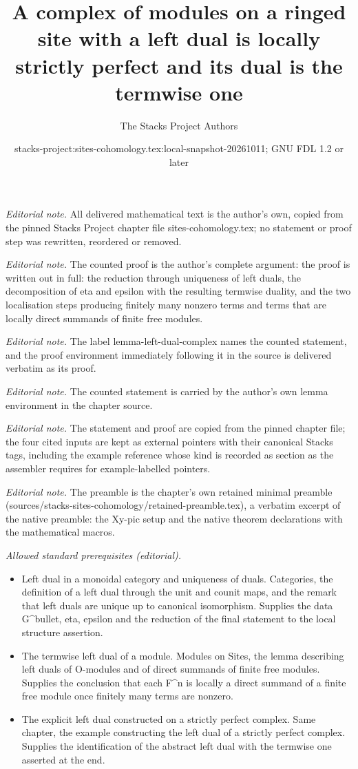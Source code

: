 \documentclass[10pt,a4paper]{amsart}
\title{A complex of modules on a ringed site with a left dual is locally strictly perfect and its dual is the termwise one}
\author{The Stacks Project Authors}
\date{stacks-project:sites-cohomology.tex:local-snapshot-20261011; GNU FDL 1.2 or later}
\theoremstyle{plain}
\theoremstyle{definition}
\theoremstyle{remark}
\numberwithin{equation}{subsection}
\begin{document}
\maketitle
\noindent\textit{Editorial note.} All delivered mathematical text is the author's own, copied from the pinned Stacks Project chapter file sites-cohomology.tex; no statement or proof step was rewritten, reordered or removed.\par\medskip
\noindent\textit{Editorial note.} The counted proof is the author's complete argument: the proof is written out in full: the reduction through uniqueness of left duals, the decomposition of eta and epsilon with the resulting termwise duality, and the two localisation steps producing finitely many nonzero terms and terms that are locally direct summands of finite free modules.\par\medskip
\noindent\textit{Editorial note.} The label lemma-left-dual-complex names the counted statement, and the proof environment immediately following it in the source is delivered verbatim as its proof.\par\medskip
\noindent\textit{Editorial note.} The counted statement is carried by the author's own lemma environment in the chapter source.\par\medskip
\noindent\textit{Editorial note.} The statement and proof are copied from the pinned chapter file; the four cited inputs are kept as external pointers with their canonical Stacks tags, including the example reference whose kind is recorded as section as the assembler requires for example-labelled pointers.\par\medskip
\noindent\textit{Editorial note.} The preamble is the chapter's own retained minimal preamble (sources/stacks-sites-cohomology/retained-preamble.tex), a verbatim excerpt of the native preamble: the Xy-pic setup and the native theorem declarations with the mathematical macros.\par\medskip
\noindent\textit{Allowed standard prerequisites (editorial).}\begin{itemize}
\item Left dual in a monoidal category and uniqueness of duals. Categories, the definition of a left dual through the unit and counit maps, and the remark that left duals are unique up to canonical isomorphism. Supplies the data G\textasciicircum{}bullet, eta, epsilon and the reduction of the final statement to the local structure assertion.
\item The termwise left dual of a module. Modules on Sites, the lemma describing left duals of O-modules and of direct summands of finite free modules. Supplies the conclusion that each F\textasciicircum{}n is locally a direct summand of a finite free module once finitely many terms are nonzero.
\item The explicit left dual constructed on a strictly perfect complex. Same chapter, the example constructing the left dual of a strictly perfect complex. Supplies the identification of the abstract left dual with the termwise one asserted at the end.
\end{itemize}\medskip
\end{document}
